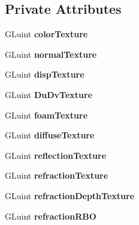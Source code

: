 \subsection*{Private Attributes}
\begin{DoxyCompactItemize}
\item 
G\+Luint {\bfseries color\+Texture}\hypertarget{class_water_a8cbfcf3124b9ad59165b1bb9d038cda3}{}\label{class_water_a8cbfcf3124b9ad59165b1bb9d038cda3}

\item 
G\+Luint {\bfseries normal\+Texture}\hypertarget{class_water_a3b1031b5363503184c25905f1ce13525}{}\label{class_water_a3b1031b5363503184c25905f1ce13525}

\item 
G\+Luint {\bfseries disp\+Texture}\hypertarget{class_water_af47af848424a2b77a5401ea40fce5be2}{}\label{class_water_af47af848424a2b77a5401ea40fce5be2}

\item 
G\+Luint {\bfseries Du\+Dv\+Texture}\hypertarget{class_water_a578b26b6bce46a5a35c9d7625a66c176}{}\label{class_water_a578b26b6bce46a5a35c9d7625a66c176}

\item 
G\+Luint {\bfseries foam\+Texture}\hypertarget{class_water_aca63d95b7fd4da371aba3e1e33978348}{}\label{class_water_aca63d95b7fd4da371aba3e1e33978348}

\item 
G\+Luint {\bfseries diffuse\+Texture}\hypertarget{class_water_a67149ababfc309e466de08324e0d3159}{}\label{class_water_a67149ababfc309e466de08324e0d3159}

\item 
G\+Luint {\bfseries reflection\+Texture}\hypertarget{class_water_ad3728a74c65a1079ee9eeee4ebedb4f3}{}\label{class_water_ad3728a74c65a1079ee9eeee4ebedb4f3}

\item 
G\+Luint {\bfseries refraction\+Texture}\hypertarget{class_water_a94d79fecc8f87726b7ef351ee02782ce}{}\label{class_water_a94d79fecc8f87726b7ef351ee02782ce}

\item 
G\+Luint {\bfseries refraction\+Depth\+Texture}\hypertarget{class_water_a0f603a4419c1ec0bb9fdb18d43ed46aa}{}\label{class_water_a0f603a4419c1ec0bb9fdb18d43ed46aa}

\item 
G\+Luint {\bfseries refraction\+R\+BO}\hypertarget{class_water_a1b313060bc5c25cd318d18143ea88663}{}\label{class_water_a1b313060bc5c25cd318d18143ea88663}


\end{DoxyCompactItemize}
